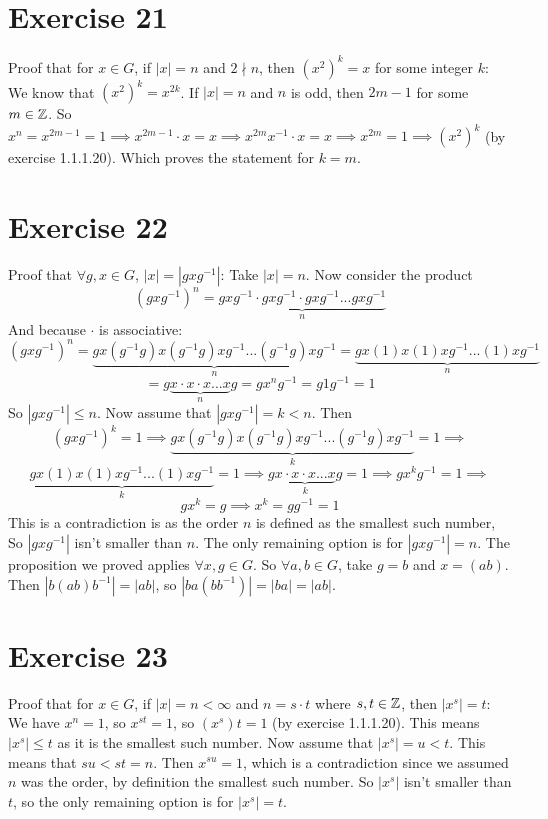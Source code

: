 \documentclass[12pt]{article}
\begin{document}
    \section*{Exercise 21}
    Proof that for $x \in G$,
    if $|x| = n$ and $2 \nmid n$,
    then $(x^2)^k = x$ for some integer $k$:
    We know that $(x^2)^k = x^{2k}$.
    If $|x| = n$ and $n$ is odd,
    then $2m - 1$ for some $m \in \mathbb{Z}$.
    So $x^n = x^{2m-1} = 1
    \implies x^{2m-1} \cdot x = x
    \implies x^{2m}x^{-1} \cdot x = x
    \implies x^{2m} = 1
    \implies (x^{2})^{k}$ (by exercise 1.1.1.20).
    Which proves the statement for $k = m$.


    \section*{Exercise 22}
    Proof that $\forall g, x \in G$, $|x| = |gxg^{-1}|$:
    Take $|x| = n$.
    Now consider the product 
    \[(gxg^{-1})^n
    = \underbrace{gxg^{-1} \cdot gxg^{-1} \cdot gxg^{-1} ... gxg^{-1}}_{n}\]
    And because $\cdot$ is associative: 
    \[(gxg^{-1})^n
    = \underbrace{gx(g^{-1}g)x(g^{-1}g)xg^{-1} ... (g^{-1}g)xg^{-1}}_{n}
    = \underbrace{gx(1)x(1)xg^{-1} ... (1)xg^{-1}}_{n}\]
    \[= g\underbrace{x \cdot x \cdot x ... x}_{n}g
    = gx^ng^{-1}
    = g1g^{-1}
    = 1\]
    So $|gxg^{-1}| \leqslant n$.
    Now assume that $|gxg^{-1}| = k < n$.
    Then 
    \[(gxg^{-1})^{k} = 1
    \implies
    \underbrace{gx(g^{-1}g)x(g^{-1}g)xg^{-1} ... (g^{-1}g)xg^{-1}}_{k} = 1
    \implies\]
    \[\underbrace{gx(1)x(1)xg^{-1} ... (1)xg^{-1}}_{k} = 1
    \implies g\underbrace{x \cdot x \cdot x ... x}_{k}g = 1
    \implies gx^kg^{-1} = 1
    \implies\]
    \[gx^k = g
    \implies x^k = gg^{-1} = 1\]
    This is a contradiction is as the order $n$
    is defined as the smallest such number,
    So $|gxg^{-1}|$ isn't smaller than $n$.
    The only remaining option is for $|gxg^{-1}| = n$.
    The proposition we proved applies $\forall x, g \in G$.
    So $\forall a, b \in G$,
    take $g = b$ and $x = (ab)$.
    Then $|b(ab)b^{-1}| = |ab|$,
    so  $|ba(bb^{-1})| = |ba| = |ab|$.


    \section*{Exercise 23}
    Proof that for $x \in G$,
    if $|x| = n < \infty$ and $n = s \cdot t$ where $s, t \in \mathbb{Z}$,
    then $|x^s| = t$: \\
    We have $x^n = 1$,
    so $x^{st} = 1$,
    so $(x^{s}){t} = 1$ (by exercise 1.1.1.20).
    This means $|x^s| \leqslant t$ as it is the smallest such number.
    Now assume that $|x^s| = u < t$.
    This means that $su < st = n$.
    Then $x^{su} = 1$,
    which is a contradiction since we assumed $n$ was the order,
    by definition the smallest such number.
    So $|x^s|$ isn't smaller than $t$,
    so the only remaining option is for $|x^s| = t$.
    
\end{document}
